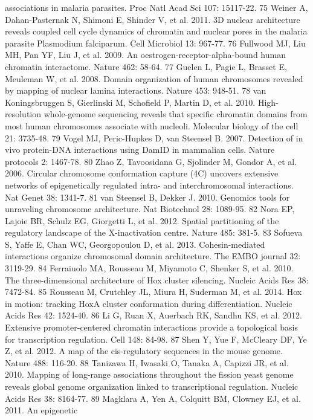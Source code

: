 associations in malaria parasites. Proc Natl Acad Sci 107: 15117-22.
75  Weiner A, Dahan-Pasternak N, Shimoni E, Shinder V, et al. 2011. 3D nuclear
architecture reveals coupled cell cycle dynamics of chromatin and nuclear
pores in the malaria parasite Plasmodium falciparum. Cell Microbiol 13:
967-77.
76  Fullwood MJ, Liu MH, Pan YF, Liu J, et al. 2009. An
oestrogen-receptor-alpha-bound human chromatin interactome. Nature 462: 58-64.
77  Guelen L, Pagie L, Brasset E, Meuleman W, et al. 2008. Domain organization
of human chromosomes revealed by mapping of nuclear lamina interactions.
Nature 453: 948-51.
78  van Koningsbruggen S, Gierlinski M, Schofield P, Martin D, et al. 2010.
High-resolution whole-genome sequencing reveals that specific chromatin
domains from most human chromosomes associate with nucleoli. Molecular biology
of the cell 21: 3735-48.
79  Vogel MJ, Peric-Hupkes D, van Steensel B. 2007. Detection of in vivo
protein-DNA interactions using DamID in mammalian cells. Nature protocols 2:
1467-78.
80  Zhao Z, Tavoosidana G, Sjolinder M, Gondor A, et al. 2006. Circular
chromosome conformation capture (4C) uncovers extensive networks of
epigenetically regulated intra- and interchromosomal interactions. Nat Genet
38: 1341-7.
81  van Steensel B, Dekker J. 2010. Genomics tools for unraveling chromosome
architecture. Nat Biotechnol 28: 1089-95.
82  Nora EP, Lajoie BR, Schulz EG, Giorgetti L, et al. 2012. Spatial
partitioning of the regulatory landscape of the X-inactivation centre. Nature
485: 381-5.
83  Sofueva S, Yaffe E, Chan WC, Georgopoulou D, et al. 2013. Cohesin-mediated
interactions organize chromosomal domain architecture. The EMBO journal 32:
3119-29.
84  Ferraiuolo MA, Rousseau M, Miyamoto C, Shenker S, et al. 2010. The
three-dimensional architecture of Hox cluster silencing. Nucleic Acids Res 38:
7472-84.
85  Rousseau M, Crutchley JL, Miura H, Suderman M, et al. 2014. Hox in motion:
tracking HoxA cluster conformation during differentiation. Nucleic Acids Res
42: 1524-40.
86  Li G, Ruan X, Auerbach RK, Sandhu KS, et al. 2012. Extensive
promoter-centered chromatin interactions provide a topological basis for
transcription regulation. Cell 148: 84-98.
87  Shen Y, Yue F, McCleary DF, Ye Z, et al. 2012. A map of the cis-regulatory
sequences in the mouse genome. Nature 488: 116-20.
88  Tanizawa H, Iwasaki O, Tanaka A, Capizzi JR, et al. 2010. Mapping of
long-range associations throughout the fission yeast genome reveals global
genome organization linked to transcriptional regulation. Nucleic Acids Res
38: 8164-77.
89  Magklara A, Yen A, Colquitt BM, Clowney EJ, et al. 2011. An epigenetic

